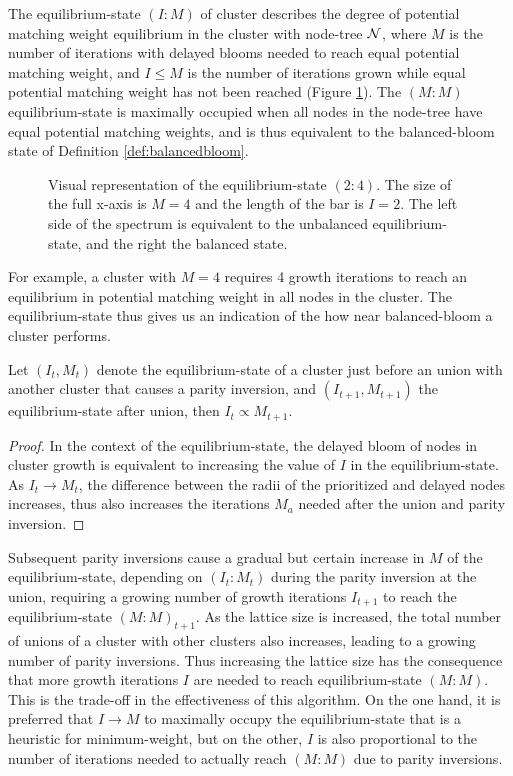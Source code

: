 \begin{definition}\label{def:eqstate}
  The equilibrium-state $(I:M)$ of cluster describes the degree of potential matching weight equilibrium in the cluster with node-tree $\mathcal{N}$, where $M$ is the number of iterations with delayed blooms needed to reach equal potential matching weight, and $I\leq M$ is the number of iterations grown while equal potential matching weight has not been reached (Figure \ref{fig:eqstate}). The $(M:M)$ equilibrium-state is maximally occupied when all nodes in the node-tree have equal potential matching weights, and is thus equivalent to the balanced-bloom state of Definition \ref{def:balancedbloom}. 
\end{definition}
\begin{figure}
  \centering
  \caption{Visual representation of the equilibrium-state $(2:4)$. The size of the full x-axis is $M=4$ and the length of the bar is $I=2$. The left side of the spectrum is equivalent to the unbalanced equilibrium-state, and the right the balanced state.}\label{fig:eqstate}
\end{figure}
For example, a cluster with $M=4$ requires 4 growth iterations to reach an equilibrium in potential matching weight in all nodes in the cluster. The equilibrium-state thus gives us an indication of the how near balanced-bloom a cluster performs. 
\begin{lemma}
  Let $(I_t, M_t)$ denote the equilibrium-state of a cluster just before an union with another cluster that causes a parity inversion, and $(I_{t+1}, M_{t+1})$ the equilibrium-state after union, then $I_t \propto M_{t+1}$.
\end{lemma}
\begin{proof}
  In the context of the equilibrium-state, the delayed bloom of nodes in cluster growth is equivalent to increasing the value of $I$ in the equilibrium-state. As $I_t\to M_t$, the difference between the radii of the prioritized and delayed nodes increases, thus also increases the iterations $M_a$ needed after the union and parity inversion. 
\end{proof}
Subsequent parity inversions cause a gradual but certain increase in $M$ of the equilibrium-state, depending on $(I_t:M_t)$ during the parity inversion at the union, requiring a growing number of growth iterations $I_{t+1}$ to reach the equilibrium-state $(M:M)_{t+1}$. As the lattice size is increased, the total number of unions of a cluster with other clusters also increases, leading to a growing number of parity inversions. Thus increasing the lattice size has the consequence that more growth iterations $I$ are needed to reach equilibrium-state $(M:M)$. This is the trade-off in the effectiveness of this algorithm. On the one hand, it is preferred that $I\to M$ to maximally occupy the equilibrium-state that is a heuristic for minimum-weight, but on the other, $I$ is also proportional to the number of iterations needed to actually reach $(M:M)$ due to parity inversions. 

